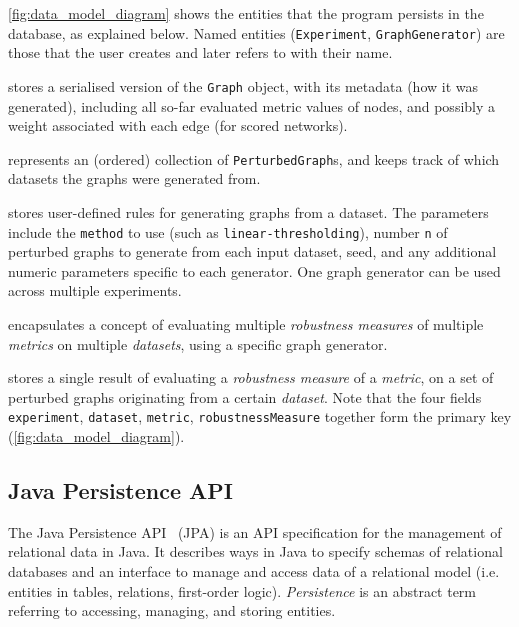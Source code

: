 \autoref{fig:data_model_diagram} shows the entities that the program persists in the database, as explained below.
Named entities (\texttt{Experiment}, \texttt{GraphGenerator}) are those that the user creates and later refers to with their name.
\begin{description}[itemsep=\zerospace]
    \item[\texttt{PerturbedGraph}]
    stores a serialised version of the \texttt{Graph} object, with its metadata (how it was generated), including all so-far evaluated metric values of nodes, and possibly a weight associated with each edge (for scored networks).

    \item[\texttt{GraphCollection}]
    represents an (ordered) collection of \texttt{PerturbedGraph}s, and keeps track of which datasets the graphs were generated from.

    \item[\texttt{GraphGenerator}]
    stores user-defined rules for generating graphs from a dataset.
    The parameters include the \texttt{method} to use (such as \texttt{linear-thresholding}), number \texttt{n} of perturbed graphs to generate from each input dataset, seed, and any additional numeric parameters specific to each generator.
    One graph generator can be used across multiple experiments.

    \item[\texttt{Experiment}]
    encapsulates a concept of evaluating multiple \textsl{robustness measures} of multiple \textsl{metrics} on multiple \textsl{datasets}, using a specific graph generator.

    \item[\texttt{Robustness}]
    stores a single result of evaluating a \textsl{robustness measure} of a \textsl{metric}, on a set of perturbed graphs originating from a certain \textsl{dataset}.
    Note that the four fields \texttt{experiment}, \texttt{dataset}, \texttt{metric}, \texttt{robustnessMeasure} together form the primary key (\autoref{fig:data_model_diagram}).
\end{description}

\subsection{Java Persistence API}

The Java Persistence API~\cite{BiswasJavaPersistenceAPI2016} (JPA) is an API specification for the management of relational data in Java.
It describes ways in Java to specify schemas of relational databases and an interface to manage and access data of a relational model (i.e. entities in tables, relations, first-order logic).
\textsl{Persistence} is an abstract term referring to accessing, managing, and storing entities.

